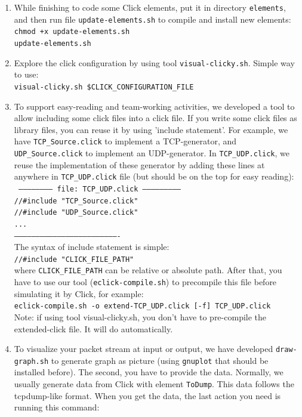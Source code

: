 \documentclass[a4paper]{article}
\begin{document}
\begin{enumerate}
        \item 
          While finishing to code some Click elements, put it in directory \texttt{elements}, and then run file \texttt{update-elements.sh} to compile and install new elements: \\
    \texttt{chmod +x update-elements.sh\\
    update-elements.sh}
        \item
        Explore the click configuration by using tool \texttt{visual-clicky.sh}. Simple way to use: \\    
    \texttt{visual-clicky.sh \$CLICK\_CONFIGURATION\_FILE}
        \item
        To support easy-reading and team-working activities, we developed a tool to allow including some click files into a click file. If you write some click files as library files, you can reuse it by using 'include statement'. For example, we have \texttt{TCP\_Source.click} to implement a TCP-generator, and \texttt{UDP\_Source.click} to implement an UDP-generator. In \texttt{TCP\_UDP.click}, we reuse the implementation of these generator by adding these lines at anywhere in \texttt{TCP\_UDP.click} file (but should be on the top for easy reading): \\
        \texttt{
  ------------------------ file: TCP\_UDP.click ---------------------------\\
  //#include "TCP\_Source.click"\\
  //#include "UDP\_Source.click"\\
  ...\\
  -------------------------------------------------------------------------}\\
  The syntax of include statement is simple:\\
          \texttt{//#include "CLICK\_FILE\_PATH"}\\
  where \texttt{CLICK\_FILE\_PATH} can be relative or absolute path. After that, you have to use our tool (\texttt{eclick-compile.sh}) to precompile this file before simulating it by Click, for example:\\
    \texttt{eclick-compile.sh -o extend-TCP\_UDP.click [-f] TCP\_UDP.click}\\
Note: if using tool visual-clicky.sh, you don't have to pre-compile the extended-click file. It will do automatically.
        \item To visualize your packet stream at input or output, we have developed \texttt{draw-graph.sh} to generate graph as picture (using \texttt{gnuplot} that should be installed before). The second, you have to provide the data. Normally, we usually generate data from Click with element \texttt{ToDump}. This data follows the tcpdump-like format. When you get the data, the last action you need is running this command:\\

\end{enumerate}
\end{document}
